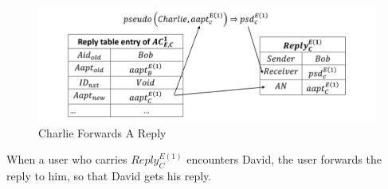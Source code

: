 \begin{figure} [H]
  \centering 
  \includegraphics[width=6.0in]{figures/FIG_4_13_Charlie_Forwards_A_Reply.png}
  \caption{Charlie Forwards A Reply} 
  \label{fig:CharlieForwardsAReply} %
\end{figure}

When a user who carries ${Reply}^{E\left(1\right)}_C$ encounters David, the user forwards the reply to him, so that David gets his reply.

